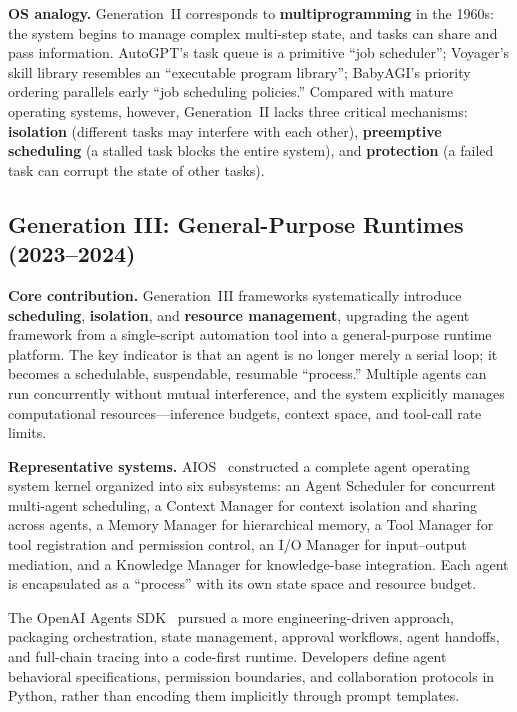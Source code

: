 \documentclass[11pt,a4paper]{article}
\begin{document}
\textbf{OS analogy.}
Generation~II corresponds to \textbf{multiprogramming} in the 1960s: the system begins to manage complex multi-step state, and tasks can share and pass information.
AutoGPT's task queue is a primitive ``job scheduler''; Voyager's skill library resembles an ``executable program library''; BabyAGI's priority ordering parallels early ``job scheduling policies.''
Compared with mature operating systems, however, Generation~II lacks three critical mechanisms: \textbf{isolation} (different tasks may interfere with each other), \textbf{preemptive scheduling} (a stalled task blocks the entire system), and \textbf{protection} (a failed task can corrupt the state of other tasks).

\subsection{Generation III: General-Purpose Runtimes (2023--2024)}

\textbf{Core contribution.}
Generation~III frameworks systematically introduce \textbf{scheduling}, \textbf{isolation}, and \textbf{resource management}, upgrading the agent framework from a single-script automation tool into a general-purpose runtime platform.
The key indicator is that an agent is no longer merely a serial loop; it becomes a schedulable, suspendable, resumable ``process.''
Multiple agents can run concurrently without mutual interference, and the system explicitly manages computational resources---inference budgets, context space, and tool-call rate limits.

\textbf{Representative systems.}
AIOS~\cite{mei2024aios} constructed a complete agent operating system kernel organized into six subsystems: an Agent Scheduler for concurrent multi-agent scheduling, a Context Manager for context isolation and sharing across agents, a Memory Manager for hierarchical memory, a Tool Manager for tool registration and permission control, an I/O Manager for input--output mediation, and a Knowledge Manager for knowledge-base integration.
Each agent is encapsulated as a ``process'' with its own state space and resource budget.

The OpenAI Agents SDK~\cite{openai_codex_agentsdk_2026} pursued a more engineering-driven approach, packaging orchestration, state management, approval workflows, agent handoffs, and full-chain tracing into a code-first runtime.
Developers define agent behavioral specifications, permission boundaries, and collaboration protocols in Python, rather than encoding them implicitly through prompt templates.
\end{document}
